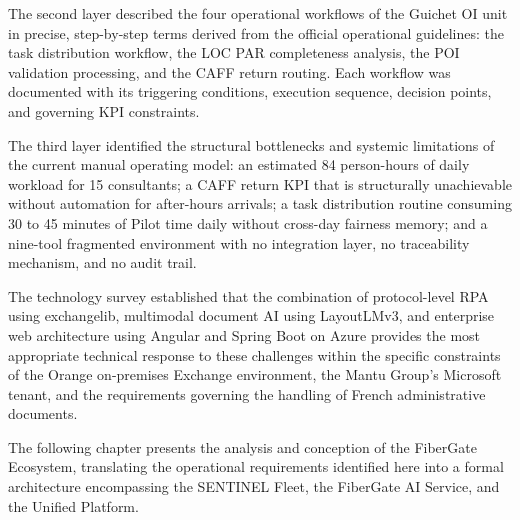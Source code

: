 The second layer described the four operational workflows of the Guichet OI unit in precise, step-by-step terms derived from the official operational guidelines: the task distribution workflow, the LOC PAR completeness analysis, the POI validation processing, and the CAFF return routing. Each workflow was documented with its triggering conditions, execution sequence, decision points, and governing KPI constraints.

The third layer identified the structural bottlenecks and systemic limitations of the current manual operating model: an estimated 84 person-hours of daily workload for 15 consultants; a CAFF return KPI that is structurally unachievable without automation for after-hours arrivals; a task distribution routine consuming 30 to 45 minutes of Pilot time daily without cross-day fairness memory; and a nine-tool fragmented environment with no integration layer, no traceability mechanism, and no audit trail.

The technology survey established that the combination of protocol-level RPA using exchangelib, multimodal document AI using LayoutLMv3, and enterprise web architecture using Angular and Spring Boot on Azure provides the most appropriate technical response to these challenges within the specific constraints of the Orange on-premises Exchange environment, the Mantu Group's Microsoft tenant, and the requirements governing the handling of French administrative documents.

The following chapter presents the analysis and conception of the FiberGate Ecosystem, translating the operational requirements identified here into a formal architecture encompassing the SENTINEL Fleet, the FiberGate AI Service, and the Unified Platform.
